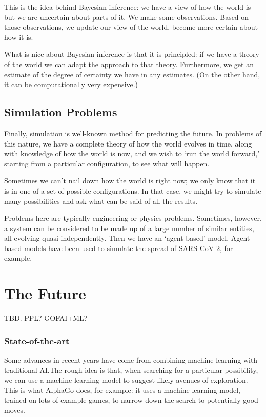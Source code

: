 \documentclass[10pt, a4, twocolumn]{article}
\begin{document}
This is the idea behind Bayesian inference: we have a view of how the world is
but we are uncertain about parts of it. We make some observations. Based on
those observations, we update our view of the world, become more certain about
how it is.

What is nice about Bayesian inference is that it is principled: if we have a
theory of the world we can adapt the approach to that theory. Furthermore, we
get an estimate of the degree of certainty we have in any estimates. (On the
other hand, it can be computationally very expensive.)

\subsection{Simulation Problems}

Finally, simulation is well-known method for predicting the future. In problems
of this nature, we have a complete theory of how the world evolves in time,
along with knowledge of how the world is now, and we wish to `run the world
forward,' starting from a particular configuration, to see what will happen.

Sometimes we can't nail down how the world is right now; we only know that it is
in one of a set of possible configurations. In that case, we might try to
simulate many possibilities and ask what can be said of all the results.

Problems here are typically engineering or physics problems. Sometimes, however,
a system can be considered to be made up of a large number of similar entities,
all evolving quasi-independently. Then we have an `agent-based'
model. Agent-based models have been used to simulate the spread of SARS-CoV-2,
for example.

\section{The Future}

TBD. PPL? GOFAI+ML? 


\subsubsection{State-of-the-art}

Some advances in recent years have come from combining machine learning with
traditional AI.\@ The rough idea is that, when searching for a particular
possibility, we can use a machine learning model to suggest likely avenues of
exploration. This is what AlphaGo does, for example: it uses a machine learning
model, trained on lots of example games, to narrow down the search to
potentially good moves.
\end{document}
